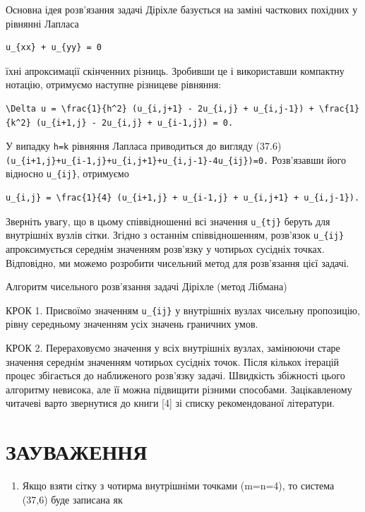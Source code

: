 \documentclass[
  ukrainian,
]{article}
\providecommand{\tightlist}{%
  \setlength{\itemsep}{0pt}\setlength{\parskip}{0pt}}
\begin{document}
Основна ідея розв'язання задачі Діріхле базується на заміні часткових
похідних у рівнянні Лапласа

\begin{verbatim}
u_{xx} + u_{yy} = 0
\end{verbatim}

їхні апроксимації скінченних різниць. Зробивши це і використавши
компактну нотацію, отримуємо наступне різницеве рівняння:

\begin{verbatim}
\Delta u = \frac{1}{h^2} (u_{i,j+1} - 2u_{i,j} + u_{i,j-1}) + \frac{1}{k^2} (u_{i+1,j} - 2u_{i,j} + u_{i-1,j}) = 0.
\end{verbatim}

У випадку \texttt{h=k} рівняння Лапласа приводиться до вигляду (37.6)
\texttt{(u\_\{i+1,j\}+u\_\{i-1,j\}+u\_\{i,j+1\}+u\_\{i,j-1\}-4u\_\{ij\})=0.}
Розв'язавши його відносно \texttt{u\_\{ij\}}, отримуємо

\begin{verbatim}
u_{i,j} = \frac{1}{4} (u_{i+1,j} + u_{i-1,j} + u_{i,j+1} + u_{i,j-1}).
\end{verbatim}

Зверніть увагу, що в цьому співвідношенні всі значення
\texttt{u\_\{tj\}} беруть для внутрішніх вузлів сітки. Згідно з останнім
співвідношенням, розв'язок \texttt{u\_\{ij\}} апроксимується середнім
значенням розв'язку у чотирьох сусідніх точках. Відповідно, ми можемо
розробити чисельний метод для розв'язання цієї задачі.

Алгоритм чисельного розв'язання задачі Діріхле (метод Лібмана)

КРОК 1. Присвоїмо значенням \texttt{u\_\{ij\}} у внутрішніх вузлах
чисельну пропозицію, рівну середньому значенням усіх значень граничних
умов.

КРОК 2. Перераховуємо значення у всіх внутрішніх вузлах, замінюючи старе
значення середнім значенням чотирьох сусідніх точок. Після кількох
ітерацій процес збігається до наближеного розв'язку задачі. Швидкість
збіжності цього алгоритму невисока, але її можна підвищити різними
способами. Зацікавленому читачеві варто звернутися до книги {[}4{]} зі
списку рекомендованої літератури.

\section{ЗАУВАЖЕННЯ}\label{ux437ux430ux443ux432ux430ux436ux435ux43dux43dux44f-1}

\begin{enumerate}
\def\labelenumi{\arabic{enumi}.}
\tightlist
\item
  Якщо взяти сітку з чотирма внутрішніми точками (m=n=4), то система
  (37,6) буде записана як
\end{enumerate}
\end{document}
